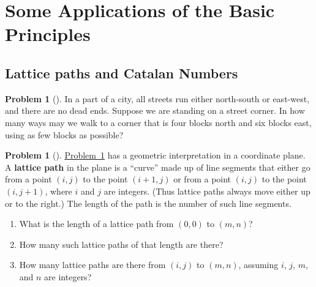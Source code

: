 \documentclass[10pt,]{book}
\newcommand{\terminology}[1]{\textbf{#1}}
\theoremstyle{plain}
\theoremstyle{definition}
\newtheorem{activity}[project]{Problem}
\theoremstyle{definition}
\numberwithin{equation}{chapter}
\begin{document}
\section[{Some Applications of the Basic Principles}]{Some Applications of the Basic Principles}\label{s1-3-apps}
\typeout{************************************************}
\typeout{************************************************}
\subsection[{Lattice paths and Catalan Numbers}]{Lattice paths and Catalan Numbers}\label{subsection-7}
\begin{activity}[] \label{blockwalking}
In a part of a city, all streets run either north-south or east-west, and there are no dead ends. Suppose we are standing on a street corner. In how many ways may we walk to a corner that is four blocks north and six blocks east, using as few blocks as possible?%
\end{activity}
\begin{activity}[] \label{latticepaths}
\hyperref[blockwalking]{Problem~\ref{blockwalking}} has a geometric interpretation in a coordinate plane. A \terminology{lattice path} in the plane is a ``curve'' made up of line segments that either go from a point \((i,j)\) to the point \((i+1,j)\) or from a point \((i,j)\) to the point \((i,j+1)\), where \(i\) and \(j\) are integers. (Thus lattice paths always move either up or to the right.) The length of the path is the number of such line segments.%
\begin{enumerate}[font=\bfseries,label=(\alph*),ref=\alph*]
\item\label{task-47} \marginsymbol[-2.5em]{} What is the length of a lattice path from \((0,0)\) to \((m,n)\)?%
\item\label{task-48} \marginsymbol[-2.5em]{} How many such lattice paths of that length are there?%
\item\label{task-49} \marginsymbol[-2.5em]{} How many lattice paths are there from \((i,j)\) to \((m,n)\), assuming \(i\), \(j\), \(m\), and \(n\) are integers?%
\end{enumerate}
\end{activity}
\end{document}
